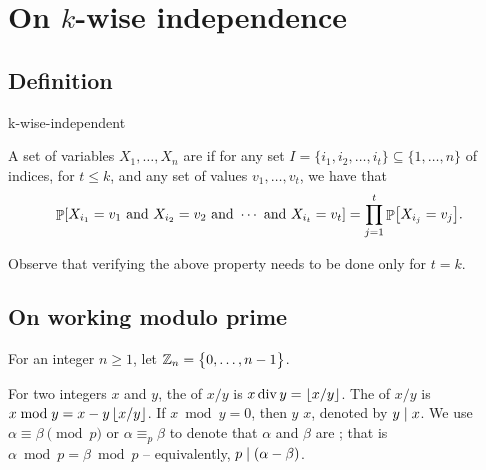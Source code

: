 \section{On $k$-wise independence}

\subsection{Definition}

\begin{fragment}{k-wise-independent}
\begin{defn}
    A set of variables $X_1, \ldots, X_n$ are  if for any set $I = \{i_1, i_2, \ldots, i_t\} \subseteq \{1,\ldots,n\}$ of
    indices, for $t \leq k$, and any set of values $v_1, \ldots, v_t$,
    we have that
    \begin{equation*}
        \Prob{
           X_{i_1} = v_1 \text{ and }
           X_{i_2} = v_2 \text{ and } \cdots \text{ and }
           X_{i_t} = v_t}%
        =%
        \prod_{j=1}^t
        \Prob{X_{i_j} = v_j}.
    \end{equation*}
\end{defn}
\end{fragment}

Observe that verifying the above property needs to be done only for
$t=k$.


\subsection{On working modulo prime}

\begin{defn}
    For an integer $n \geq 1$, let $\mathbb{Z}_n = \left\{ {0, \ldots, n-1 \bigl. } \right\}$.
    
    For two integers $x$ and $y$, the  of $x/y$
    is $x \mathop{\mathrm{div}} y = \left\lfloor {x/y} \right\rfloor$. The  of $x/y$ is
    $x \bmod y = x - y \left\lfloor {x/y} \right\rfloor$. If $x \bmod y = 0$, then $y$
     $x$, denoted by $y \mid x$.  We use
    $\alpha \equiv \beta \pmod{p}$ or $\alpha \equiv_p \beta$ to
    denote that $\alpha$ and $\beta$ are ;
    that is $\alpha \bmod p = \beta \bmod p$ -- equivalently,
    $p \divides \pth[]{\alpha - \beta}$.
\end{defn}

